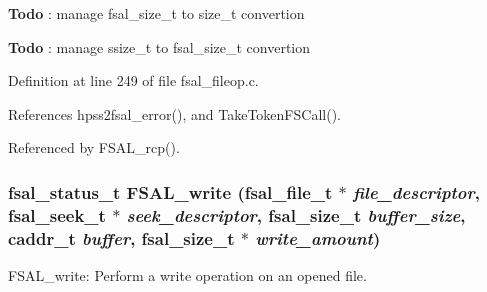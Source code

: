 \begin{Desc}
\item[{\bf Todo}]: manage fsal\_\-size\_\-t to size\_\-t convertion \end{Desc}


\begin{Desc}
\item[{\bf Todo}]: manage ssize\_\-t to fsal\_\-size\_\-t convertion \end{Desc}


Definition at line 249 of file fsal\_\-fileop.c.

References hpss2fsal\_\-error(), and TakeTokenFSCall().

Referenced by FSAL\_\-rcp().
\subsubsection[{FSAL\_\-write}]{\setlength{\rightskip}{0pt plus 5cm}fsal\_\-status\_\-t FSAL\_\-write (fsal\_\-file\_\-t $\ast$ {\em file\_\-descriptor}, \/  fsal\_\-seek\_\-t $\ast$ {\em seek\_\-descriptor}, \/  fsal\_\-size\_\-t {\em buffer\_\-size}, \/  caddr\_\-t {\em buffer}, \/  fsal\_\-size\_\-t $\ast$ {\em write\_\-amount})}\label{fsal__fileop_8c_b18f5e98a2fcadd1f2051e1cc5d459dc}


FSAL\_\-write: Perform a write operation on an opened file.

